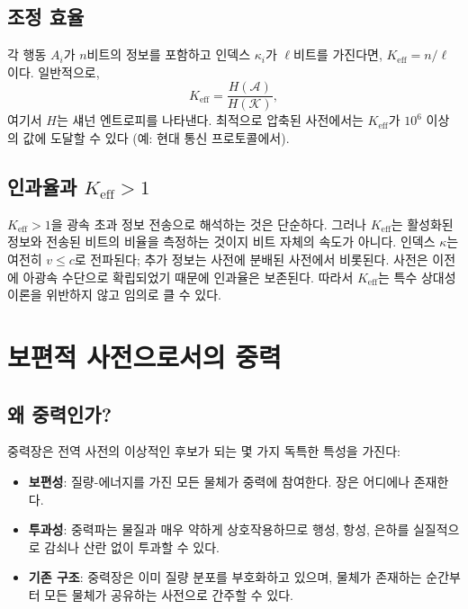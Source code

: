 \documentclass[12pt,a4paper]{article}
\newcommand{\Keff}{K_{\mathrm{eff}}}
\begin{document}
	\subsection{조정 효율}
	\label{subsec:keff}
	
	각 행동 \(A_i\)가 \(n\)비트의 정보를 포함하고 인덱스 \(\kappa_i\)가 \(\ell\)비트를 가진다면, \(\Keff = n/\ell\)이다. 일반적으로,
	\begin{equation}
		\Keff = \frac{H(\mathcal{A})}{H(\mathcal{K})},
	\end{equation}
	여기서 \(H\)는 섀넌 엔트로피를 나타낸다. 최적으로 압축된 사전에서는 \(\Keff\)가 \(10^6\) 이상의 값에 도달할 수 있다 (예: 현대 통신 프로토콜에서).
	
	\subsection{인과율과 \(K_{\mathrm{eff}} > 1\)}
	\label{subsec:causality}
	
	\(\Keff > 1\)을 광속 초과 정보 전송으로 해석하는 것은 단순하다. 그러나 \(\Keff\)는 활성화된 정보와 전송된 비트의 비율을 측정하는 것이지 비트 자체의 속도가 아니다. 인덱스 \(\kappa\)는 여전히 \(v \le c\)로 전파된다; 추가 정보는 사전에 분배된 사전에서 비롯된다. 사전은 이전에 아광속 수단으로 확립되었기 때문에 인과율은 보존된다. 따라서 \(\Keff\)는 특수 상대성 이론을 위반하지 않고 임의로 클 수 있다.
	
	\section{보편적 사전으로서의 중력}
	\label{sec:gravity}
	
	\subsection{왜 중력인가?}
	
	중력장은 전역 사전의 이상적인 후보가 되는 몇 가지 독특한 특성을 가진다:
	\begin{itemize}
		\item \textbf{보편성}: 질량-에너지를 가진 모든 물체가 중력에 참여한다. 장은 어디에나 존재한다.
		\item \textbf{투과성}: 중력파는 물질과 매우 약하게 상호작용하므로 행성, 항성, 은하를 실질적으로 감쇠나 산란 없이 투과할 수 있다.
		\item \textbf{기존 구조}: 중력장은 이미 질량 분포를 부호화하고 있으며, 물체가 존재하는 순간부터 모든 물체가 공유하는 사전으로 간주할 수 있다.
	\end{itemize}
	
\end{document}
